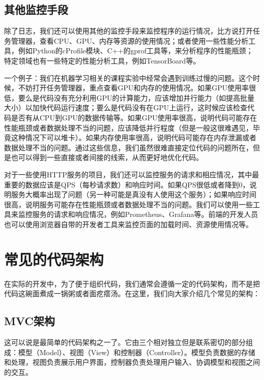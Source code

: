 \documentclass[../main.tex]{subfiles}
\begin{document}
\subsection{其他监控手段}\label{subsec:other-monitoring}

除了日志，我们还可以使用其他的监控手段来监控程序的运行情况，比方说打开任务管理器，查看CPU、GPU、内存等资源的使用情况；或者使用一些性能分析工具，例如Python的cProfile模块、C++的gprof工具等，来分析程序的性能瓶颈；特定领域也有一些特定的性能分析工具，例如TensorBoard等。

一个例子：我们在机器学习相关的课程实验中经常会遇到训练过慢的问题。这个时候，不妨打开任务管理器，重点查看GPU和内存的使用情况。如果GPU使用率很低，要么是代码没有充分利用GPU的计算能力，应该增加并行能力（如提高批量大小）以加快代码运行速度；要么是代码没有在GPU上运行，这时候应该检查代码是否有从CPU到GPU的数据传输等。如果GPU使用率很高，说明代码可能存在性能瓶颈或者数据处理不当的问题，应该降低并行程度（但是一般这很难遇见，毕竟这种情况下可以堆卡）。如果内存使用率很高，说明代码可能存在内存泄漏或者数据处理不当的问题。通过这些信息，我们虽然很难直接定位代码的问题所在，但是也可以得到一些直接或者间接的线索，从而更好地优化代码。

对于一些使用HTTP服务的项目，我们还可以监控服务的请求和相应情况，其中最重要的数据应该是QPS（每秒请求数）和响应时间。如果QPS很低或者降到0，说明服务大概率出现了问题（另一种可能是真没有人使用这个服务）；如果响应时间很高，说明服务可能存在性能瓶颈或者数据处理不当的问题。我们可以使用一些工具来监控服务的请求和响应情况，例如Prometheus、Grafana等。前端的开发人员也可以使用浏览器自带的开发者工具来监控页面的加载时间、资源使用情况等。

\section{常见的代码架构}\label{sec:code-architecture}

在实际的开发中，为了便于组织代码，我们通常会遵循一定的代码架构，而不是把代码这碗面煮成一锅粥或者面疙瘩汤。在这里，我们向大家介绍几个常见的架构：

\subsection{MVC架构}

这可以说是最简单的代码架构之一了。它由三个相对独立但是联系密切的部分组成：模型（Model）、视图（View）和控制器（Controller）。模型负责数据的存储和处理，视图负责展示用户界面，控制器负责处理用户输入、协调模型和视图之间的交互。
\end{document}
